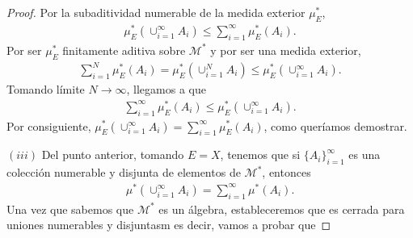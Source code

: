 \begin{proof}
    Por la subaditividad numerable de la medida exterior $ \mu_E^*$,
    \begin{align*}
        \mu_E^*(\cup_{i=1}^{\infty}{A_i}) \leq \sum_{i=1}^{\infty}{\mu_E^*(A_i)}.
    \end{align*}
    Por ser $ \mu_E^*$ finitamente aditiva sobre $\mathcal{M}^*$ y por ser una medida exterior,
    \begin{align*}
        \sum_{i=1}^{N}{\mu_E^*(A_i)} = \mu_E^*(\cup_{i=1}^{N}{A_i}) \leq \mu_E^*(\cup_{i=1}^{\infty}{A_i}).
    \end{align*}
    Tomando límite $N \to \infty$, llegamos a que
    \begin{align*}
        \sum_{i=1}^{\infty}{\mu_E^*(A_i)}  \leq \mu_E^*(\cup_{i=1}^{\infty}{A_i}).
    \end{align*}
    Por consiguiente, $\mu_E^*(\cup_{i=1}^{\infty}{A_i}) = \sum_{i=1}^{\infty}{\mu_E^*(A_i)}$, como queríamos demostrar.

    $(iii)$ Del punto anterior, tomando $E = X$, tenemos que si $\{A_i\}_{i=1}^{\infty}$ es una colección numerable y disjunta de elementos de $\mathcal{M}^*$, entonces
    \begin{align*}
        \mu^*(\cup_{i=1}^{\infty}{A_i}) = \sum_{i=1}^{\infty}{\mu^*(A_i)}.
    \end{align*}
    Una vez que sabemos que $\mathcal{M}^*$ es un álgebra, estableceremos que es cerrada para uniones numerables y disjuntasm es decir, vamos a probar que


\end{proof}
